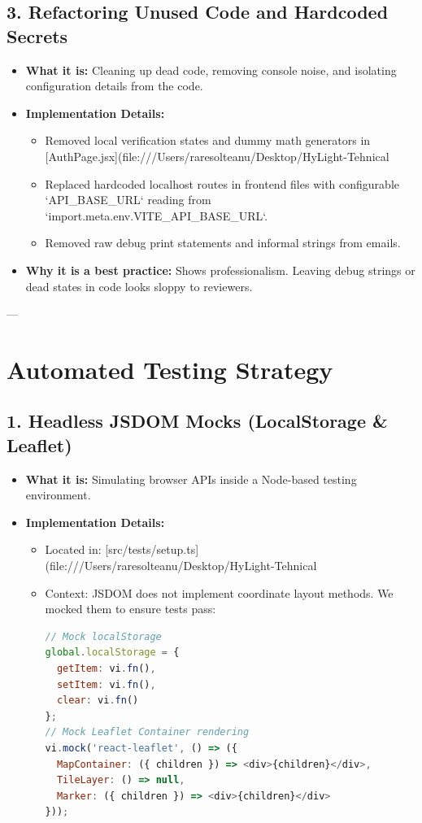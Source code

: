 \documentclass[11pt]{article}
\begin{document}
\subsection{3. Refactoring Unused Code and Hardcoded Secrets}
\begin{itemize}
    \item \textbf{What it is:} Cleaning up dead code, removing console noise, and isolating configuration details from the code.
    \item \textbf{Implementation Details:}
      \begin{itemize}
        \item Removed local verification states and dummy math generators in [AuthPage.jsx](file:///Users/raresolteanu/Desktop/HyLight-Tehnical%
        \item Replaced hardcoded localhost routes in frontend files with configurable `API_BASE_URL` reading from `import.meta.env.VITE_API_BASE_URL`.
        \item Removed raw debug print statements and informal strings from emails.
      \end{itemize}
    \item \textbf{Why it is a best practice:} Shows professionalism. Leaving debug strings or dead states in code looks sloppy to reviewers.
\end{itemize}

---

\section{Automated Testing Strategy}

\subsection{1. Headless JSDOM Mocks (LocalStorage \& Leaflet)}
\begin{itemize}
    \item \textbf{What it is:} Simulating browser APIs inside a Node-based testing environment.
    \item \textbf{Implementation Details:}
      \begin{itemize}
        \item Located in: [src/tests/setup.ts](file:///Users/raresolteanu/Desktop/HyLight-Tehnical%
        \item Context: JSDOM does not implement coordinate layout methods. We mocked them to ensure tests pass:
\begin{lstlisting}[language=JavaScript]
// Mock localStorage
global.localStorage = {
  getItem: vi.fn(),
  setItem: vi.fn(),
  clear: vi.fn()
};
// Mock Leaflet Container rendering
vi.mock('react-leaflet', () => ({
  MapContainer: ({ children }) => <div>{children}</div>,
  TileLayer: () => null,
  Marker: ({ children }) => <div>{children}</div>
}));
\end{lstlisting}
      \end{itemize}
\end{itemize}
\end{document}
